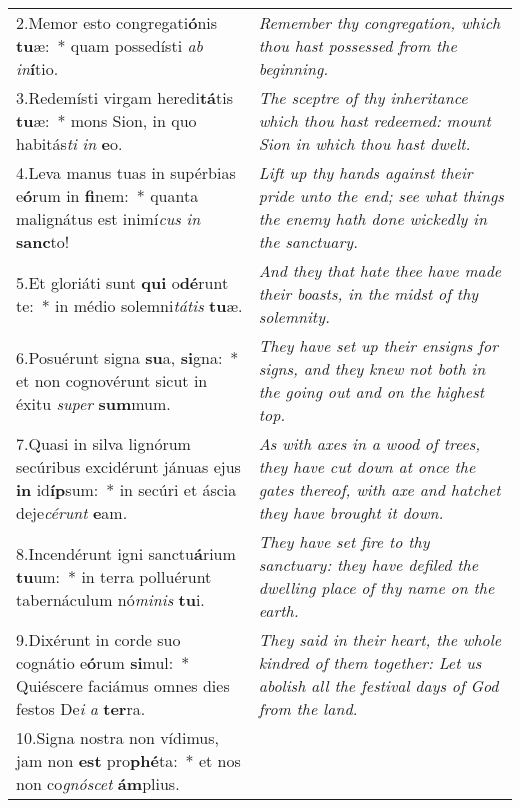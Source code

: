 \begin{longtable}{@{\hskip0pt} p{10cm} | p{6cm} @{\hskip0pt}}
2.\enspace Memor esto congregati\textbf{ó}nis \textbf{tu}æ:~* quam possedísti \textit{ab} \textit{in}\textbf{í}tio.
 & \textit{\small Remember thy congregation, which thou hast possessed from the beginning.
}\\
3.\enspace Redemísti virgam heredi\textbf{tá}tis \textbf{tu}æ:~* mons Sion, in quo habitás\textit{ti} \textit{in} \textbf{e}o.
 & \textit{\small The sceptre of thy inheritance which thou hast redeemed: mount Sion in which thou hast dwelt.
}\\
4.\enspace Leva manus tuas in supérbias e\textbf{ó}rum in \textbf{fi}nem:~* quanta malignátus est inimí\textit{cus} \textit{in} \textbf{sanc}to!
 & \textit{\small Lift up thy hands against their pride unto the end; see what things the enemy hath done wickedly in the sanctuary.
}\\
5.\enspace Et gloriáti sunt \textbf{qui} o\textbf{dé}runt te:~* in médio solemni\textit{tá}\textit{tis} \textbf{tu}æ.
 & \textit{\small And they that hate thee have made their boasts, in the midst of thy solemnity.
}\\
6.\enspace Posuérunt signa \textbf{su}a, \textbf{si}gna:~* et non cognovérunt sicut in éxitu \textit{su}\textit{per} \textbf{sum}mum.
 & \textit{\small They have set up their ensigns for signs, and they knew not both in the going out and on the highest top.
}\\
7.\enspace Quasi in silva lignórum secúribus excidérunt jánuas ejus \textbf{in} id\textbf{íp}sum:~* in secúri et áscia deje\textit{cé}\textit{runt} \textbf{e}am.
 & \textit{\small As with axes in a wood of trees, they have cut down at once the gates thereof, with axe and hatchet they have brought it down.
}\\
8.\enspace Incendérunt igni sanctu\textbf{á}rium \textbf{tu}um:~* in terra polluérunt tabernáculum nó\textit{mi}\textit{nis} \textbf{tu}i.
 & \textit{\small They have set fire to thy sanctuary: they have defiled the dwelling place of thy name on the earth.
}\\
9.\enspace Dixérunt in corde suo cognátio e\textbf{ó}rum \textbf{si}mul:~* Quiéscere faciámus omnes dies festos De\textit{i} \textit{a} \textbf{ter}ra.
 & \textit{\small They said in their heart, the whole kindred of them together: Let us abolish all the festival days of God from the land.
}\\
10.\enspace Signa nostra non vídimus, jam non \textbf{est} pro\textbf{phé}ta:~* et nos non co\textit{gnó}\textit{scet} \textbf{ám}plius.

\end{longtable}

